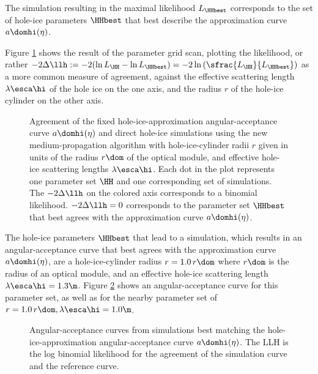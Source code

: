 The simulation resulting in the maximal likelihood $L_\HHbest$ corresponds to the set of hole-ice parameters $\HHbest$ that best describe the approximation curve $a\domhi(\eta)$.

Figure \ref{fig:AWa5aiCh} shows the result of the parameter grid scan, plotting the likelihood, or rather $-2\Delta\llh:= -2(\ln L_\HH - \ln L_\HHbest) = -2 \ln \left(\sfrac{L_\HH}{L_\HHbest}\right)$ as a more common measure of agreement, against the effective scattering length $\lambda\esca\hi$ of the hole ice on the one axis, and the radius $r$ of the hole-ice cylinder on the other axis.

\begin{figure}[htbp]
  \caption{Agreement of the fixed hole-ice-approximation angular-acceptance curve $a\domhi(\eta)$ and direct hole-ice simulations using the new \clsim medium-propagation algorithm with hole-ice-cylinder radii $r$ given in units of the radius $r\dom$ of the optical module, and effective hole-ice scattering lengths $\lambda\esca\hi$. Each dot in the plot represents one parameter set $\HH$ and one corresponding set of simulations. The $-2\Delta\llh$ on the colored axis corresponds to a binomial likelihood. $-2\Delta\llh = 0$ corresponds to the parameter set $\HHbest$ that best agrees with the approximation curve $a\domhi(\eta)$.}
  \label{fig:AWa5aiCh}
\end{figure}

The hole-ice parameters $\HHbest$ that lead to a simulation, which results in an angular-acceptance curve that best agrees with the approximation curve $a\domhi(\eta)$, are a hole-ice-cylinder radius $r = 1.0\,r\dom$ where $r\dom$ is the radius of an optical module, and an effective hole-ice scattering length $\lambda\esca\hi = 1.3\m$. Figure \ref{fig:weShir8i} shows an angular-acceptance curve for this parameter set, as well as for the nearby parameter set of $r=1.0\,r\dom, \lambda\esca\hi = 1.0\m$.

\begin{figure}[htbp]
  \hfill
  \caption{Angular-acceptance curves from simulations best matching the hole-ice-approximation angular-acceptance curve $a\domhi(\eta)$. The LLH is the log binomial likelihood for the agreement of the simulation curve and the reference curve.}
  \label{fig:weShir8i}
\end{figure}

